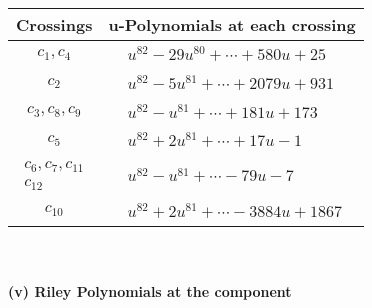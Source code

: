 \documentclass[1p]{elsarticle_modified}
\theoremstyle{definition}
\begin{document}
\begin{tabular}{m{50pt}|m{274pt}}
Crossings & \hspace{64pt}u-Polynomials at each crossing \\
\hline $$\begin{aligned}c_{1},c_{4}\end{aligned}$$&$\begin{aligned}
&u^{82}-29 u^{80}+\cdots+580 u+25
\end{aligned}$\\
\hline $$\begin{aligned}c_{2}\end{aligned}$$&$\begin{aligned}
&u^{82}-5 u^{81}+\cdots+2079 u+931
\end{aligned}$\\
\hline $$\begin{aligned}c_{3},c_{8},c_{9}\end{aligned}$$&$\begin{aligned}
&u^{82}- u^{81}+\cdots+181 u+173
\end{aligned}$\\
\hline $$\begin{aligned}c_{5}\end{aligned}$$&$\begin{aligned}
&u^{82}+2 u^{81}+\cdots+17 u-1
\end{aligned}$\\
\hline $$\begin{aligned}c_{6},c_{7},c_{11}\\c_{12}\end{aligned}$$&$\begin{aligned}
&u^{82}- u^{81}+\cdots-79 u-7
\end{aligned}$\\
\hline $$\begin{aligned}c_{10}\end{aligned}$$&$\begin{aligned}
&u^{82}+2 u^{81}+\cdots-3884 u+1867
\end{aligned}$\\
\hline
\end{tabular}\\~\\
\newpage\renewcommand{\arraystretch}{1}
\flushleft \textbf{(v) Riley Polynomials at the component}\newline \\
\end{document}
